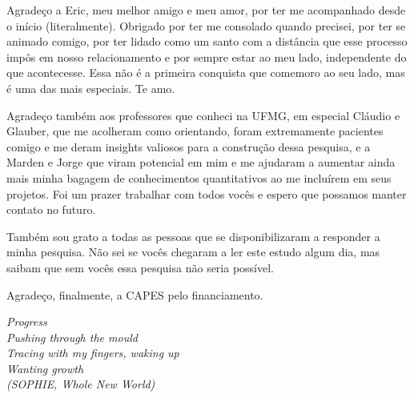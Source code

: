 \documentclass[
	12pt,				%
	oneside,			%
	a4paper,			%
	sumario=tradicional,
	english,			%
	brazil				%
	]{abntex2}
\begin{document}
\begin{agradecimentos}
 Agradeço a Eric, meu melhor amigo e meu amor, por ter me acompanhado desde o início (literalmente). Obrigado por ter me consolado quando precisei, por ter se animado comigo, por ter lidado como um santo com a distância que esse processo impôs em nosso relacionamento e por sempre estar ao meu lado, independente do que acontecesse. Essa não é a primeira conquista que comemoro ao seu lado, mas é uma das mais especiais. Te amo.

 Agradeço também aos professores que conheci na UFMG, em especial Cláudio e Glauber, que me acolheram como orientando, foram extremamente pacientes comigo e me deram insights valiosos para a construção dessa pesquisa, e a Marden e Jorge que viram potencial em mim e me ajudaram a aumentar ainda mais minha bagagem de conhecimentos quantitativos ao me incluírem em seus projetos. Foi um prazer trabalhar com todos vocês e espero que possamos manter contato no futuro.

 Também sou grato a todas as pessoas que se disponibilizaram a responder a minha pesquisa. Não sei se vocês chegaram a ler este estudo algum dia, mas saibam que sem vocês essa pesquisa não seria possível.

 Agradeço, finalmente, a CAPES pelo financiamento.
\end{agradecimentos}

\begin{epigrafe}
	\vspace*{\fill}
	\begin{flushright}
		\textit{Progress\\
Pushing through the mould\\
Tracing with my fingers, waking up\\
Wanting growth\\
(SOPHIE, Whole New World)}
	\end{flushright}
\end{epigrafe}

\end{document}
